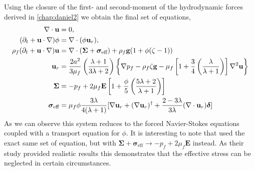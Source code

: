Using the closure of the first- and second-moment of the hydrodynamic forces derived in \ref{chap:daniel2} we obtain the final set of equations, 
\begin{align}
    \mathbf{\nabla}\cdot\textbf{u}&=0, \\
    (\partial_t + \textbf{u}\cdot \mathbf{\nabla})\phi &= \mathbf{\nabla}\cdot(\phi \textbf{u}_r), \\
    \rho_f (\partial_t 
    + \textbf{u}\cdot \mathbf{\nabla})
    \textbf{u}
    &= 
    \mathbf{\nabla}\cdot (\bm\Sigma + \bm{\sigma}_\text{eff})
    + \rho_f \textbf{g} (1 + \phi(\zeta-1) )\\
    \textbf{u}_{r} 
    &= 
    \frac{2 a^2}{3\mu_f}\left(\frac{\lambda+1}{3\lambda+2}\right)
    \left\{
        \mathbf{\nabla} p_f
        - \rho_f\zeta   \textbf{g}
        -  \mu_f \left[
            1 + \frac{3}{4} \left(\frac{\lambda}{\lambda+1}\right)
            \right]\mathbf{\nabla}^2 \textbf{u}
    \right\}
    \\
    \bm\Sigma& = 
    - p_f +2\mu_f  \textbf{E} \left[1 + \frac{\phi}{5}\left(\frac{5\lambda +2}{\lambda +1}\right)\right] \\
    \bm\sigma_\text{eff} &= \mu_f \phi      
    \frac{3\lambda}{4(\lambda + 1)}[\mathbf{\nabla} \textbf{u}_{r} +(\mathbf{\nabla} \textbf{u}_{r})^\dagger +\frac{2-3\lambda}{3\lambda}(\mathbf{\nabla}\cdot  \textbf{u}_{r})\bm\delta] 
\end{align}
As we can observe this system reduces to the forced Navier-Stokes equations coupled with a transport equation for $\phi$. 
It is interesting to note that \citet{kriaa2023two} used the exact same set of equation, but with $\bm\Sigma + \bm\sigma_\text{eff} \to -p_f +2 \mu_f \textbf{E}$ instead. 
As their study provided realistic results this demonstrates that the effective stress can be neglected in certain circumstances. 




